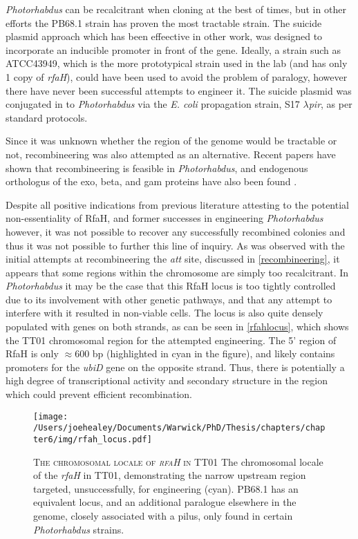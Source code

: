 \emph{Photorhabdus} can be recalcitrant when cloning at the best of times, but in other efforts the PB68.1 strain has proven the most tractable \Pasy{} strain. The suicide plasmid approach which has been effeective in other work, was designed to incorporate an inducible promoter in front of the gene. Ideally, a \Pasy{} strain such as ATCC43949, which is the more prototypical \Pasy{} strain used in the lab (and has only 1 copy of \emph{rfaH}), could have been used to avoid the problem of paralogy, however there have never been successful attempts to engineer it. The suicide plasmid was conjugated in to \emph{Photorhabdus} via the \emph{E. coli} propagation strain, S17 $\lambda$\emph{pir}, as per standard protocols.

Since it was unknown whether the region of the genome would be tractable or not, recombineering was also attempted as an alternative. Recent papers have shown that recombineering is feasible in \emph{Photorhabdus}, and endogenous orthologus of the exo, beta, and gam proteins have also been found \citep{Yin2015}.

Despite all positive indications from previous literature attesting to the potential non-essentiality of RfaH, and former successes in engineering \emph{Photorhabdus} however, it was not possible to recover any successfully recombined colonies and thus it was not possible to further this line of inquiry. As was observed with the initial attempts at recombineering the \emph{att} site, discussed in \vref{recombineering}, it appears that some regions within the chromosome are simply too recalcitrant. In \emph{Photorhabdus} it may be the case that this RfaH locus is too tightly controlled due to its involvement with other genetic pathways, and that any attempt to interfere with it resulted in non-viable cells. The locus is also quite densely populated with genes on both strands, as can be seen in \vref{rfahlocus}, which shows the \Plum{} TT01 chromosomal region for the attempted engineering. The 5' region of RfaH is only $\approx$600 bp (highlighted in cyan in the figure), and likely contains promoters for the \emph{ubiD} gene on the opposite strand. Thus, there is potentially a high degree of transcriptional activity and secondary structure in the region which could prevent efficient recombination.

\begin{figure}[h!]
    \texttt{[image: /Users/joehealey/Documents/Warwick/PhD/Thesis/chapters/chapter6/img/rfah\_locus.pdf]}
    \captionsetup{singlelinecheck=off, justification=justified, font=footnotesize, aboveskip=5pt}
    \caption[RfaH locale in \Plum{} TT01]{\textsc{\normalsize The chromosomal locale of \emph{rfaH} in \Plum{} TT01} \vspace{0.1cm} \newline The chromosomal locale of the \emph{rfaH} in \Plum{} TT01, demonstrating the narrow upstream region targeted, unsuccessfully, for engineering (cyan). \Pasy{} PB68.1 has an equivalent locus, and an additional paralogue elsewhere in the genome, closely associated with a pilus, only found in certain \emph{Photorhabdus} strains.}
\label{rfahlocus}
\end{figure}

